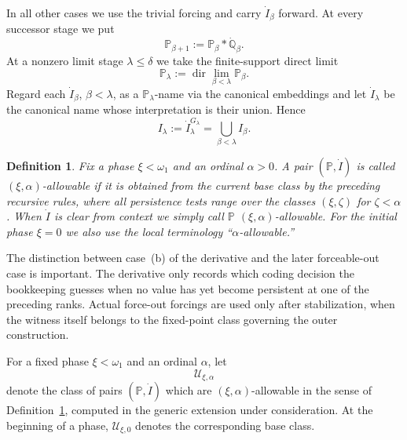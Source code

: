 \documentclass[a4paper,11pt]{article}
\newtheorem{definition}[theorem]{Definition}
\newcommand{\forceP}{\mathbb{P}}
\newcommand{\forceQ}{\mathbb{Q}}
\begin{document}
In all other cases we use the trivial forcing and carry $\dot I_\beta$ forward. At every successor stage we put
\[
\forceP_{\beta+1}:=\forceP_\beta*\dot{\forceQ}_\beta.
\]
At a nonzero limit stage $\lambda\leq\delta$ we take the finite-support direct limit
\[
\forceP_\lambda
:=\operatorname{dir}\lim_{\beta<\lambda}\forceP_\beta.
\]
Regard each $\dot I_\beta$, $\beta<\lambda$, as a $\forceP_\lambda$-name via the canonical embeddings and let $\dot I_\lambda$ be the canonical name whose interpretation is their union. Hence
\[
I_\lambda
:=\dot I_\lambda^{G_\lambda}
=\bigcup_{\beta<\lambda}I_\beta.
\]

\begin{definition}\label{UniformizationAlphaAllowable}
Fix a phase $\xi<\omega_1$ and an ordinal $\alpha>0$. A pair $(\forceP,\dot I)$ is called $(\xi,\alpha)$-allowable if it is obtained from the current base class by the preceding recursive rules, where all persistence tests range over the classes $(\xi,\zeta)$ for $\zeta<\alpha$. When $\dot I$ is clear from context we simply call $\forceP$ $(\xi,\alpha)$-allowable. For the initial phase $\xi=0$ we also use the local terminology ``$\alpha$-allowable.''
\end{definition}

The distinction between case~(b) of the derivative and the later forceable-out case is important. The derivative only records which coding decision the bookkeeping guesses when no value has yet become persistent at one of the preceding ranks. Actual force-out forcings are used only after stabilization, when the witness itself belongs to the fixed-point class governing the outer construction.

For a fixed phase $\xi<\omega_1$ and an ordinal $\alpha$, let
\[
\mathcal U_{\xi,\alpha}
\]
denote the class of pairs $(\forceP,\dot I)$ which are $(\xi,\alpha)$-allowable in the sense of Definition~\ref{UniformizationAlphaAllowable}, computed in the generic extension under consideration. At the beginning of a phase, $\mathcal U_{\xi,0}$ denotes the corresponding base class.
\end{document}
